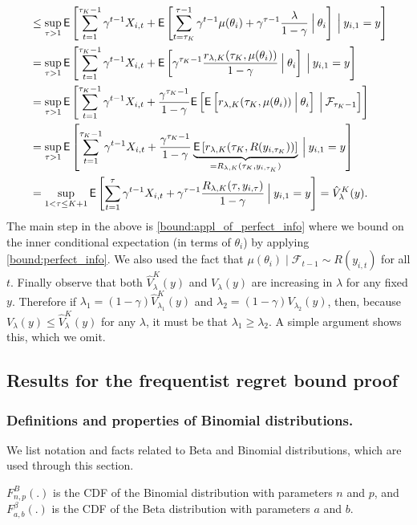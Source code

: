 \begin{myproof}[Proof.]
\begin{align}
	& \le \sup_{\tau > 1}\Ee{\sum_{t=1}^{\tau_K-1} \gamma^{t-1} X_{i,t} + \Ee{\sum_{t=\tau_K}^{\tau-1} \gamma^{t-1} \mu(\theta_i) + \gamma^{\tau-1} \frac{\lambda}{1-\gamma} \given[\Big] \theta_i}\given[\Big] y_{i,1} = y} \label{bound:appl_of_perfect_info} \\
	& = \sup_{\tau > 1}\Ee{\sum_{t=1}^{\tau_K-1} \gamma^{t-1} X_{i,t} +  \Ee{ \gamma^{\tau_K - 1} \frac{r_{\lambda,K}(\tau_K, \mu(\theta_i))}{1-\gamma} \given[\Big] \theta_i}\given[\Big] y_{i,1} = y} \nonumber \\
	& = \sup_{\tau > 1}\Ee{\sum_{t=1}^{\tau_K-1} \gamma^{t-1} X_{i,t} +  \frac{\gamma^{\tau_K - 1}}{1-\gamma}\Ee{\Ee{  r_{\lambda,K}( \tau_K, \mu(\theta_i)) \given[\Big] \theta_i} \given[\Big] \mathcal{F}_{\tau_K-1}}} \nonumber \\
	& = \sup_{\tau > 1}\Ee{\sum_{t=1}^{\tau_K-1} \gamma^{t-1} X_{i,t} +  \frac{\gamma^{\tau_K - 1}}{1-\gamma}\underbrace{\Ee{  r_{\lambda,K}( \tau_K, R(y_{i,\tau_K}))}}_{ = R_{\lambda,K}(\tau_K, y_{i,\tau_K})}\given[\Big] y_{i,1} = y} \nonumber \\
	& = \sup_{1 < \tau \le K+1}\Ee{\sum_{t=1}^{\tau} \gamma^{t-1} X_{i,t} +  \gamma^{\tau - 1} \frac{ R_{\lambda,K}(\tau, y_{i,\tau})}{1-\gamma}\given[\Big] y_{i,1} = y}  = \hat V^K_\lambda(y). \nonumber
	\end{align}
	The main step in the above is \eqref{bound:appl_of_perfect_info} where we bound on the inner conditional expectation (in terms of $\theta_i$) by applying \eqref{bound:perfect_info}. We also used the fact that $\mu(\theta_i) \; | \; \mathcal F_{t-1} \sim R(y_{i,t})$ for all $t$. Finally observe that both $\hat V^K_\lambda(y)$ and $V_\lambda(y)$ are increasing in $\lambda$ for any fixed $y$. Therefore if $\lambda_1 = (1-\gamma) \hat V^K_{\lambda_1}(y)$ and $\lambda_2 = (1-\gamma) V_{\lambda_2}(y)$, then, because $V_{\lambda}(y) \le \hat V^K_{\lambda}(y)$ for any $\lambda$, it must be that  $\lambda_1 \ge \lambda_2$. A simple argument shows this, which we omit.
\end{myproof}
\subsection{Results for the frequentist regret bound proof}
\subsubsection{Definitions and properties of Binomial distributions.}
We list notation and facts related to Beta and Binomial distributions, which are used through this section.
\begin{definition}
	$F^B_{n,p}(.)$ is the CDF of the Binomial distribution with parameters $n$ and $p$, and $F^\beta_{a,b}(.)$ is the CDF of the Beta distribution with parameters $a$ and $b$.
\end{definition}

